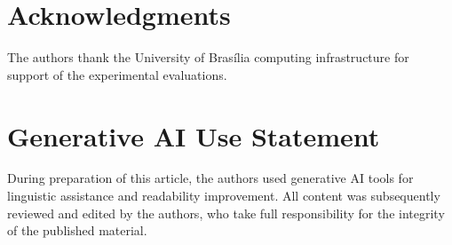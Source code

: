 \documentclass[a4paper,fleqn]{cas-dc}
\begin{document}
\section*{Acknowledgments}
The authors thank the University of Bras\'ilia computing infrastructure
for support of the experimental evaluations.
\begin{sloppypar}
\section*{Generative AI Use Statement}
During preparation of this article, the authors used generative AI tools
for linguistic assistance and readability improvement. All content was
subsequently reviewed and edited by the authors, who take full
responsibility for the integrity of the published material.
\end{sloppypar}


\end{document}
